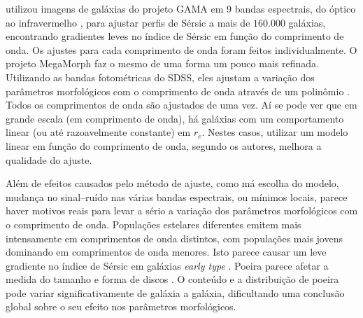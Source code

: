 \citet{Kelvin2012} utilizou imagens de galáxias do projeto GAMA
\citep{Driver2009} em 9 bandas espectrais, do óptico \citep[bandas $ugriz$ do
SDSS DR7]{Abazajian2009} ao infravermelho \citep[bandas $YJHK$ do
UKIDSS]{Lawrence2007}, para ajustar perfis de Sérsic a mais de $160.000$
galáxias, encontrando gradientes leves no índice de Sérsic em função do
comprimento de onda. Os ajustes para cada comprimento de onda foram feitos
individualmente. O projeto MegaMorph \citep{Haussler2013} faz o mesmo de uma
forma um pouco mais refinada. Utilizando as bandas fotométricas do SDSS, eles
ajustam a variação dos parâmetros morfológicos com o comprimento de onda através
de um polinômio \citep[Figura \ref{fig:propertiesVika}]{Vika2013}. Todos os
comprimentos de onda são ajustados de uma vez. Aí se pode ver que em grande
escala (em comprimento de onda), há galáxias com um comportamento linear (ou até
razoavelmente constante) em $r_e$. Nestes casos, utilizar um modelo linear em
função do comprimento de onda, segundo os autores, melhora a qualidade do
ajuste.

Além de efeitos causados pelo método de ajuste, como má escolha do modelo,
mudança no sinal--ruído nas várias bandas espectrais, ou mínimos locais, parece
haver motivos reais para levar a sério a variação dos parâmetros morfológicos
com o comprimento de onda. Populações estelares diferentes emitem mais
intensamente em comprimentos de onda distintos, com populações mais jovens
dominando em comprimentos de onda menores.
Isto parece causar um leve gradiente no índice de Sérsic em galáxias {\em early
type} \citep{LaBarbera2009}. Poeira parece afetar a medida do tamanho e forma de
discos \citep{Mollenhoff2006}. O conteúdo e a distribuição de poeira pode variar
significativamente de galáxia a galáxia, dificultando uma conclusão global sobre
o seu efeito nos parâmetros morfológicos.

